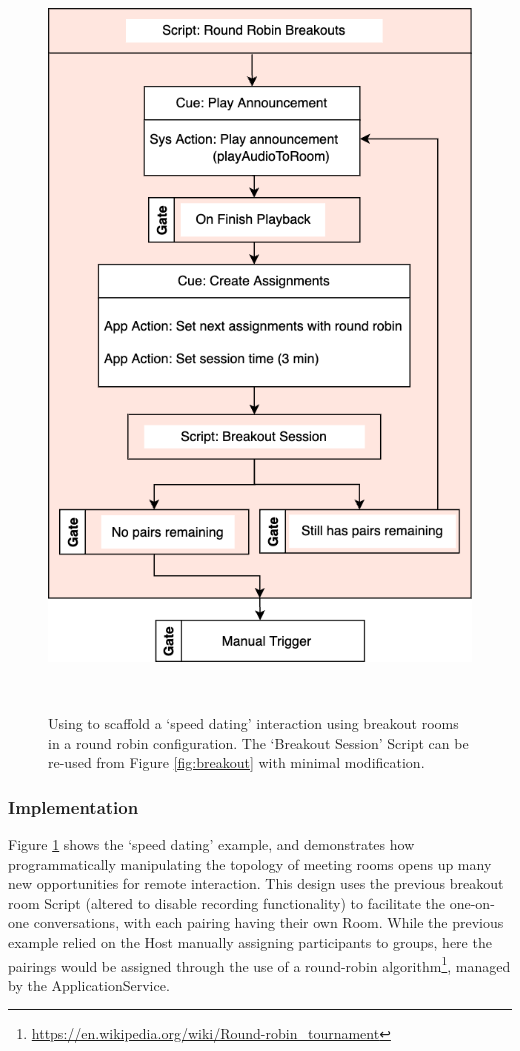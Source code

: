 \begin{figure}[h]
  \centering
  \includegraphics[width=0.4\columnwidth]{images/example_speeddating.drawio.png}
  \Description{}
  \caption{Using \ONT{} to scaffold a `speed dating' interaction using breakout rooms in a round robin configuration. The `Breakout Session' Script can be re-used from Figure \ref{fig:breakout} with minimal modification.}~\label{fig:roundrobin}
\end{figure}

\subsubsection{\ONT{} Implementation}
Figure \ref{fig:roundrobin} shows the `speed dating' example, and demonstrates how programmatically manipulating the topology of meeting rooms opens up many new opportunities for remote interaction. This design uses the previous breakout room Script (altered to disable recording functionality) to facilitate the one-on-one conversations, with each pairing having their own Room. While the previous example relied on the Host manually assigning participants to groups, here the pairings would be assigned through the use of a round-robin algorithm\footnote{\url{https://en.wikipedia.org/wiki/Round-robin\_tournament}}, managed by the ApplicationService.
